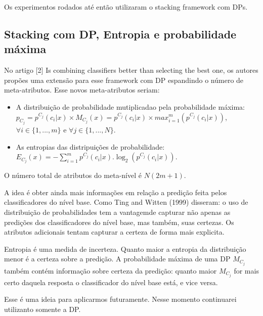 \documentclass[]{article}
\begin{document}
Os experimentos rodados até então utilizaram o stacking framework com
DPs.

\subsection{Stacking com DP, Entropia e probabilidade
máxima}\label{stacking-com-dp-entropia-e-probabilidade-maxima}

No artigo {[}2{]} Is combining classifiers better than selecting the
best one, os autores propões uma extensão para esse framework com DP
espandindo o número de meta-atributos. Esse novos meta-atributos seriam:

\begin{itemize}
\item
  A distribuição de probabilidade mutiplicadao pela probabilidade
  máxima:
  \(p_{C_j} = p^{C_j}(c_i|x) \times M_{C_j}(x) = p^{C_j}(c_i|x) \times max_{i=1}^{m}(p^{C_j}(c_i|x))\),
  \(\forall i \in \{1,...,m\}\) e \(\forall j \in \{1,...,N\}\).
\item
  As entropias das distripuições de probabilidade:
  \(E_{C_j}(x) = -\sum_{i=1}^{m}p^{C_j}(c_i|x).\log_2(p^{C_j}(c_i|x))\).
\end{itemize}

O número total de atributos do meta-nível é \(N(2m+1)\).

A idea é obter ainda mais informações em relação a predição feita pelos
classificadores do nível base. Como Ting and Witten (1999) disseram: o
uso de distribuição de probabilidades tem a vantagemde capturar não
apenas as predições dos classificadores do nível base, mas também, suas
certezas. Os atributos adicionais tentam capturar a certeza de forma
mais explicita.

Entropia é uma medida de incerteza. Quanto maior a entropia da
distribuição menor é a certeza sobre a predição. A probabilidade máxima
de uma DP \(M_{C_j}\) também contém informação sobre certeza da
predição: quanto maior \(M_{C_j}\) for mais certo daquela resposta o
classificador do nível base está, e vice versa.

Esse é uma ideia para aplicarmos futuramente. Nesse momento continuarei
utilizanto somente a DP.
\end{document}
